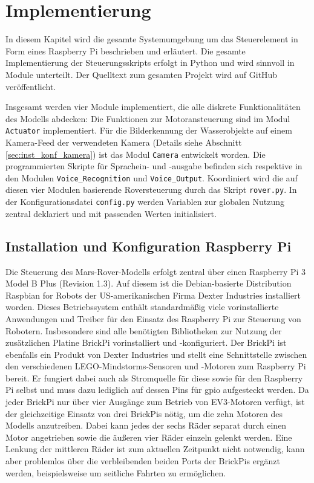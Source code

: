 \chapter{Implementierung}
\label{chp:implementierung}

In diesem Kapitel wird die gesamte Systemumgebung um das Steuerelement in Form eines Raspberry Pi beschrieben und erläutert.
Die gesamte Implementierung der Steuerungsskripts erfolgt in Python und wird sinnvoll in Module unterteilt.
Der Quelltext zum gesamten Projekt wird auf GitHub veröffentlicht.

Insgesamt werden vier Module implementiert, die alle diskrete Funktionalitäten des Modells abdecken: Die Funktionen zur Motoransteuerung sind im Modul \texttt{Actuator} implementiert. 
Für die Bilderkennung der Wasserobjekte auf einem Kamera-Feed der verwendeten Kamera (Details siehe Abschnitt \ref{sec:inst_konf_kamera}) ist das Modul \texttt{Camera} entwickelt worden.
Die programmierten Skripte für Sprachein- und -ausgabe befinden sich respektive in den Modulen \texttt{Voice\_Recognition} und \texttt{Voice\_Output}.
Koordiniert wird die auf diesen vier Modulen basierende Roversteuerung durch das Skript \texttt{rover.py}.
In der Konfigurationsdatei \texttt{config.py} werden Variablen zur globalen Nutzung zentral deklariert und mit passenden Werten initialisiert.

\section{Installation und Konfiguration Raspberry Pi}
\label{sec:inst_konf_raspi}

Die Steuerung des Mars-Rover-Modells erfolgt zentral über einen Raspberry Pi 3 Model B Plus (Revision 1.3).
Auf diesem ist die Debian-basierte Distribution Raspbian for Robots der US-amerikanischen Firma Dexter Industries installiert worden.
Dieses Betriebssystem enthält standardmäßig viele vorinstallierte Anwendungen und Treiber für den Einsatz des Raspberry Pi zur Steuerung von Robotern.
Insbesondere sind alle benötigten Bibliotheken zur Nutzung der zusätzlichen Platine BrickPi vorinstalliert und -konfiguriert.
Der BrickPi ist ebenfalls ein Produkt von Dexter Industries und stellt eine Schnittstelle zwischen den verschiedenen LEGO-Mindstorms-Sensoren und -Motoren zum Raspberry Pi bereit.
Er fungiert dabei auch als Stromquelle für diese sowie für den Raspberry Pi selbst und muss dazu lediglich auf dessen Pins für \acf{gpio} aufgesteckt werden.
Da jeder BrickPi nur über vier Ausgänge zum Betrieb von EV3-Motoren verfügt, ist der gleichzeitige Einsatz von drei BrickPis nötig, um die zehn Motoren des Modells anzutreiben.
Dabei kann jedes der sechs Räder separat durch einen Motor angetrieben sowie die äußeren vier Räder einzeln gelenkt werden.
Eine Lenkung der mittleren Räder ist zum aktuellen Zeitpunkt nicht notwendig, kann aber problemlos über die verbleibenden beiden Ports der BrickPis ergänzt werden, beispielsweise um seitliche Fahrten zu ermöglichen.


